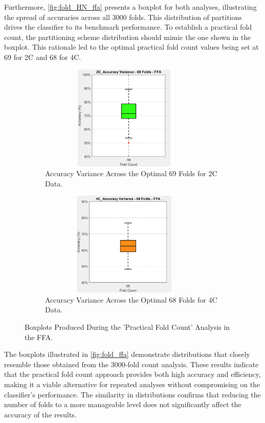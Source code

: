 Furthermore, \autoref{fig:fold_HN_ffa} presents a boxplot for both analyses, illustrating the spread of accuracies across all 3000 folds. This distribution of partitions drives the classifier to its benchmark performance. To establish a practical fold count, the partitioning scheme distribution should mimic the one shown in the boxplot. This rationale led to the optimal practical fold count values being set at 69 for \gls{2C} and 68 for \gls{4C}.

\begin{figure}[htbp]
 	\centering
	\begin{subfigure}{0.49\textwidth}
		\centering
		\includegraphics[width = 0.9\textwidth, height = 5cm]{assets/images/box_2C_69_ffa.png}
		\caption{Accuracy Variance Across the Optimal 69 Folds for \gls{2C} Data.}
		\label{fig:2C_69_ffa}
	\end{subfigure}
	\hfill
	\begin{subfigure}{0.49\textwidth}
		\centering
	 	\includegraphics[width = 0.9\textwidth, height = 5cm]{assets/images/box_4C_68_ffa.png}
		\caption{Accuracy Variance Across the Optimal 68 Folds for \gls{4C} Data.}
		\label{fig:4C_68_ffa}
	\end{subfigure}
	\caption[Accuracies At Optimal Fold Count Boxplots For The FFA]{Boxplots Produced During the 'Practical Fold Count' Analysis in the \gls{FFA}.}
 	\label{fig:fold_ffa}
\end{figure}

The boxplots illustrated in \autoref{fig:fold_ffa} demonstrate distributions that closely resemble those obtained from the 3000-fold count analysis. These results indicate that the practical fold count approach provides both high accuracy and efficiency, making it a viable alternative for repeated analyses without compromising on the classifier's performance. The similarity in distributions confirms that reducing the number of folds to a more manageable level does not significantly affect the accuracy of the results.

